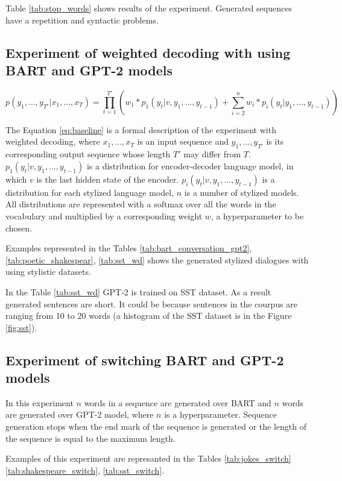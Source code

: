 Table \ref{tab:stop_words} shows results of the experiment. Generated sequences have a repetition and syntactic problems.

\subsection{Experiment of weighted decoding with using BART and GPT-2 models}
\begin{equation} \label{eq:baseline}
p(y_1, ... , y_{T'}|x_1, ... , x_T) = \prod_{t=1}^{T'} ( w_1 * p_1(y_t|v, y_1, ... , y_{t-1}) + \sum_{i=2}^n w_i * p_i(y_t| y_1, ... , y_{t-1}))
\end{equation}

The Equation \ref{eq:baseline} is a formal description of the experiment with weighted decoding, where $x_1, ... , x_T$ is an input sequence and $y_1, ... , y_{T'}$ is its corresponding output sequence whose length $T'$ may differ from $T$. $p_1(y_t|v, y_1, ... , y_{t-1})$ is a distribution for encoder-decoder language model, in which $v$ is the last hidden state of the encoder. $p_i(y_t|v, y_1, ... , y_{t-1})$ is a distribution for each stylized language model, $n$ is a number of stylized models. All distributions are represented with a softmax over all the words in the vocabulary and multiplied by a corresponding weight $w$, a hyperparameter to be chosen. 

Examples represented in the Tables \ref{tab:bart_conversation_gpt2}, \ref{tab:poetic_shakespear}, \ref{tab:sst_wd} shows the generated stylized dialogues with using stylistic datasets. 

In the Table \ref{tab:sst_wd} GPT-2 is trained on SST dataset. As a result generated sentences are short. It could be because sentences in the courpus are ranging from 10 to 20 words (a histogram of the SST dataset is in the Figure \ref{fig:sst}).

\subsection{Experiment of switching BART and GPT-2 models}
In this experiment $n$ words in a sequence are generated over BART and $n$ words are generated over GPT-2 model, where $n$ is a hyperparameter. Sequence generation stops when the end mark of the sequence is generated or the length of the sequence is equal to the maximum length.

Examples of this experiment are represanted in the Tables \ref{tab:jokes_switch} \ref{tab:shakespeare_switch}, \ref{tab:sst_switch}.

